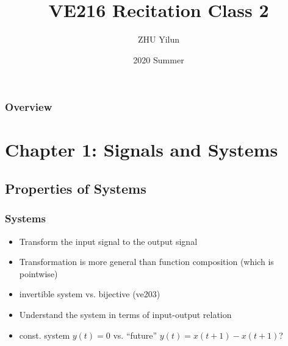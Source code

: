 \documentclass{beamer}
\title[VE216]{VE216 Recitation Class 2} %
\author{ZHU Yilun} %
\institute[SJTU] %
{
UM-SJTU Joint Institute \\ %
\medskip
\textit{VE216 SU20 Teaching Group} %
}
\date{2020 Summer} %
\begin{document}
\begin{frame}
\titlepage %
\end{frame}

\begin{frame}
\frametitle{Overview} %
\tableofcontents %
\end{frame}







\section{Chapter 1: Signals and Systems}






\subsection{Properties of Systems}

\begin{frame}
    \frametitle{Systems}
\begin{itemize}
    \item Transform the input signal to the output signal
    \item Transformation is more general than function composition (which is pointwise)
    \bigskip
    \item invertible system vs. bijective (ve203)
    
    \item Understand the system in terms of input-output relation
    \item const. system $y(t) = 0$ vs. ``future'' $ y(t) = x(t+1) - x(t+1)$?
\end{itemize}

\end{frame}
\end{document}
